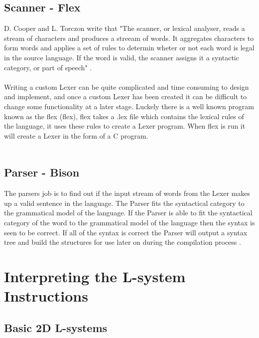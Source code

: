 \subsection{Scanner - Flex} \label{Flex}

D. Cooper and L. Torczon write that "The scanner, or lexical analyser, reads a stream of characters and produces a streeam of words. It aggregates characters to form words and applies a set of rules to determin wheter or not each word is legal in the source language. If the word is valid, the scanner assigns it a syntactic category, or part of speech" \cite{cooper2011engineering}. \\
\\ 
Writing a custom \gls{Lexer} can be quite complicated and time consuming to design and implement, and once a custom \gls{Lexer} has been created it can be difficult to change some functionality at a later stage. Luckely there is a well known program known as the \acrlong{flex} (\acrshort{flex}), \acrshort{flex} takes a .lex file which contains the lexical rules of the language, it uses these rules to create a \gls{Lexer} program. When \acrshort{flex} is run it will create a \gls{Lexer} in the form of a C program. \\
\\    


\subsection{Parser - Bison} \label{Bison}

The parsers job is to find out if the input stream of words from the \gls{Lexer} makes up a valid sentence in the language. The \gls{Parser} fits the syntactical category to the grammatical model of the language. If the \gls{Parser} is able to fit the syntactical category of the word to the grammatical model of the language then the syntax is seen to be correct. If all of the syntax is correct the \gls{Parser} will output a syntax tree and build the structures for use later on during the compilation process \cite{cooper2011engineering}.


\section{Interpreting the L-system Instructions}

\subsection{Basic 2D L-systems} 


